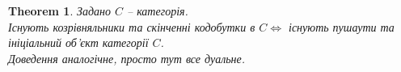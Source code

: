 \documentclass[a4paper, 10pt]{article}
\theoremstyle{theoremdd}
\newtheorem{theorem}{Theorem}[subsection]
\begin{document}
\begin{theorem}
Задано $C$ -- категорія.\\
Існують козрівняльники та скінченні кодобутки в $C \iff$ існують пушаути та ініціальний об'єкт категорії $C$.\\
\textit{Доведення аналогічне, просто тут все дуальне.}
\end{theorem}
\end{document}

